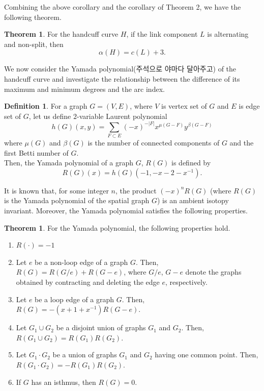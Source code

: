 \documentclass{article}
\theoremstyle{definition}
\newtheorem{defn}[thm]{Definition}
\theoremstyle{theorem}
\newtheorem{theorem}[thm]{Theorem}
\theoremstyle{proposition}
\theoremstyle{corollary}
\begin{document}
Combining the above corollary and the corollary of Theorem 2, we have the following theorem.

\begin{theorem}
    For the handcuff curve $H$, if the link component $L$ is alternating and non-split, then
    \[ \alpha(H) = c(L)+3. \]
\end{theorem}

We now consider the Yamada polynomial(주석으로 야마다 달아주고) of the handcuff curve and investigate the relationship between the difference of its maximum and minimum degrees and the arc index.

\begin{defn}
    For a graph $G=(V, E)$, where $V$ is vertex set of $G$ and $E$ is edge set of $G$, let us define $2$-variable Laurent polynomial
    \[ h(G)(x, y) = \sum_{F \subset E} (-x)^{-|F|} x^{\mu(G-F)} y^{\beta(G-F)} \]
    where $\mu(G)$ and $\beta(G)$ is the number of connected components of $G$ and the first Betti number of $G$. \\
    Then, the Yamada polynomial of a graph $G$, $R(G)$ is defined by
    \[ R(G)(x) = h(G)(-1, -x-2-x^{-1}). \]
\end{defn}

It is known that, for some integer $n$, the product $(-x)^n R(G)$ (where $R(G)$ is the Yamada polynomial of the spatial graph $G$) is an ambient isotopy invariant. Moreover, the Yamada polynomial satisfies the following properties.

\begin{theorem}
    For the Yamada polynomial, the following properties hold.
    \begin{enumerate}
        \item $R( \cdot ) = -1$
        \item Let $e$ be a non-loop edge of a graph $G$. Then, $R(G) = R(G / e) + R(G - e)$, where $G/e$, $G-e$ denote the graphs obtained by contracting and deleting the edge $e$, respectively.
        \item Let $e$ be a loop edge of a graph $G$. Then, $R(G) = -(x+1+x^{-1}) R(G-e)$.
        \item Let $G_1 \cup G_2$ be a disjoint union of graphs $G_1$ and $G_2$. Then, $R(G_1 \cup G_2) = R(G_1)R(G_2)$.
        \item Let $G_1 \cdot G_2$ be a union of graphs $G_1$ and $G_2$ having one common point. Then, $R(G_1 \cdot G_2) = -R(G_1)R(G_2)$.
        \item If $G$ has an isthmus, then $R(G)=0$.
    \end{enumerate}
\end{theorem}
\end{document}
